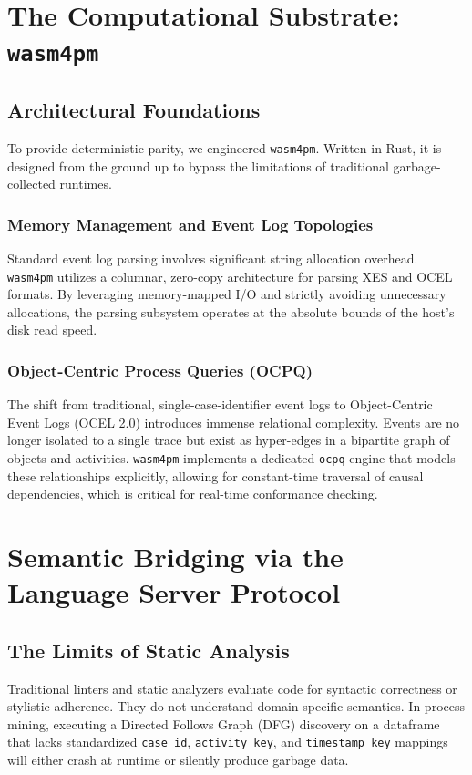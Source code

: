 \documentclass[11pt,twoside,openright]{book}
\begin{document}
\chapter{The Computational Substrate: \texttt{wasm4pm}}

\section{Architectural Foundations}
To provide deterministic parity, we engineered \texttt{wasm4pm}. Written in Rust, it is designed from the ground up to bypass the limitations of traditional garbage-collected runtimes. 

\subsection{Memory Management and Event Log Topologies}
Standard event log parsing involves significant string allocation overhead. \texttt{wasm4pm} utilizes a columnar, zero-copy architecture for parsing XES and OCEL formats. By leveraging memory-mapped I/O and strictly avoiding unnecessary allocations, the parsing subsystem operates at the absolute bounds of the host's disk read speed.

\subsection{Object-Centric Process Queries (OCPQ)}
The shift from traditional, single-case-identifier event logs to Object-Centric Event Logs (OCEL 2.0) introduces immense relational complexity. Events are no longer isolated to a single trace but exist as hyper-edges in a bipartite graph of objects and activities. \texttt{wasm4pm} implements a dedicated \texttt{ocpq} engine that models these relationships explicitly, allowing for constant-time traversal of causal dependencies, which is critical for real-time conformance checking.

\chapter{Semantic Bridging via the Language Server Protocol}

\section{The Limits of Static Analysis}
Traditional linters and static analyzers evaluate code for syntactic correctness or stylistic adherence. They do not understand domain-specific semantics. In process mining, executing a Directed Follows Graph (DFG) discovery on a dataframe that lacks standardized \texttt{case\_id}, \texttt{activity\_key}, and \texttt{timestamp\_key} mappings will either crash at runtime or silently produce garbage data.
\end{document}
